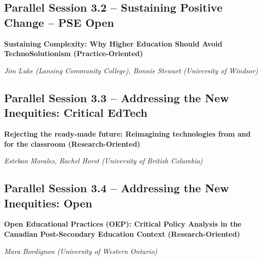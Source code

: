 \documentclass[
]{book}
\begin{document}
\hypertarget{parallel-session-3.2-sustaining-positive-change-pse-open}{%
\subsection*{Parallel Session 3.2 -- Sustaining Positive Change -- PSE Open}\label{parallel-session-3.2-sustaining-positive-change-pse-open}}

\begin{secondary}
\textbf{Sustaining Complexity: Why Higher Education Should Avoid
TechnoSolutionism (Practice-Oriented)}

\emph{Jim Luke (Lansing Community College), Bonnie Stewart (University
of Windsor)}
\end{secondary}

\hypertarget{parallel-session-3.3-addressing-the-new-inequities-critical-edtech}{%
\subsection*{Parallel Session 3.3 -- Addressing the New Inequities: Critical EdTech}\label{parallel-session-3.3-addressing-the-new-inequities-critical-edtech}}

\begin{secondary}
\textbf{Rejecting the ready-made future: Reimagining technologies from
and for the classroom (Research-Oriented)}

\emph{Esteban Morales, Rachel Horst (University of British Columbia)}
\end{secondary}

\hypertarget{parallel-session-3.4-addressing-the-new-inequities-open}{%
\subsection*{Parallel Session 3.4 -- Addressing the New Inequities: Open}\label{parallel-session-3.4-addressing-the-new-inequities-open}}

\begin{secondary}
\textbf{Open Educational Practices (OEP): Critical Policy Analysis in
the Canadian Post-Secondary Education Context (Research-Oriented)}

\emph{Mara Bordignon (University of Western Ontario)}
\end{secondary}
\end{document}
